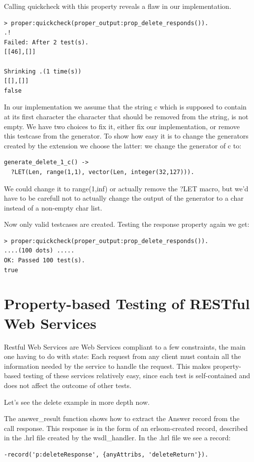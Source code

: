 \documentclass[submission,copyright,a4]{eptcs}
\begin{document}
Calling quickcheck with this property reveals a flaw in our implementation.
\begin{lstlisting}
> proper:quickcheck(proper_output:prop_delete_responds()). 
.!
Failed: After 2 test(s).
[[46],[]]

Shrinking .(1 time(s))
[[],[]]
false
\end{lstlisting}

In our implementation we assume that the string c which is supposed to contain at its first character the character that should be removed from the string, is not empty. We have two choices to fix it, either fix our implementation, or remove this testcase from the generator. To show how easy it is to change the generators created by the extension we choose the latter: we change the generator of c to:

\begin{lstlisting}
generate_delete_1_c() ->
  ?LET(Len, range(1,1), vector(Len, integer(32,127))).
\end{lstlisting}
We could change it to range(1,inf) or actually remove the ?LET macro, but we'd have to be carefull not to actually change the output of the generator to a char instead of a non-empty char list.

Now only valid testcases are created. Testing the response property again we get:
\begin{lstlisting}
> proper:quickcheck(proper_output:prop_delete_responds()).
....(100 dots) .....
OK: Passed 100 test(s).
true
\end{lstlisting}

\section{Property-based Testing of RESTful Web Services}

Restful Web Services are Web Services compliant to a few constraints, the main one having to do with state: Each request from any client must contain all the information needed by the service to handle the request. This makes property-based testing of these services relatively easy, since each test is self-contained and does not affect the outcome of other tests. 

Let's see the delete example in more depth now. 

The answer\_result function shows how to extract the Answer record from the call response. This response is in the form of an erlsom-created record, described in the .hrl file created by the wsdl\_handler. In the .hrl file we see a record: 
\begin{lstlisting}
-record('p:deleteResponse', {anyAttribs, 'deleteReturn'}).
\end{lstlisting}
\end{document}

